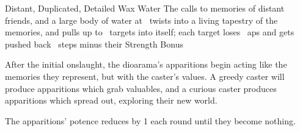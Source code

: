   {Distant, Duplicated, Detailed}%
  {Wax}%
  {Water}%
  {}%
  {The  calls to memories of distant friends, and a large body of water at \spellRange\ twists into a living tapestry of the memories, and pulls up to ~targets into itself; each target loses ~\glspl{ap} and gets pushed back ~\glspl{step} minus their Strength Bonus}%
  {
  After the initial onslaught, the dioarama's apparitions begin acting like the memories they represent, but with the caster's values.
  A greedy caster will produce apparitions which grab valuables, and a curious caster produces apparitions which spread out, exploring their new world.

  The apparitions' potence reduces by 1 each \gls{round} until they become nothing.}
